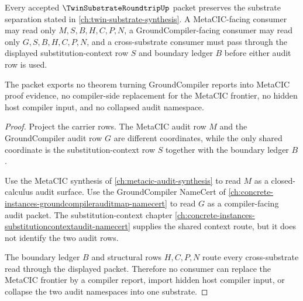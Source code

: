 \begin{theorem}
\label{thm:twinsubstrate-roundtrip-substrate-separation}
Every accepted $\TwinSubstrateRoundtripUp$ packet preserves the substrate separation stated in \autoref{ch:twin-substrate-synthesis}. A MetaCIC-facing consumer may read only $M,S,B,H,C,P,N$, a GroundCompiler-facing consumer may read only $G,S,B,H,C,P,N$, and a cross-substrate consumer must pass through the displayed substitution-context row $S$ and boundary ledger $B$ before either audit row is used.

The packet exports no theorem turning GroundCompiler reports into MetaCIC proof evidence, no compiler-side replacement for the MetaCIC frontier, no hidden host compiler input, and no collapsed audit namespace.
\end{theorem}
\begin{proof}
Project the carrier rows. The MetaCIC audit row $M$ and the GroundCompiler audit row $G$ are different coordinates, while the only shared coordinate is the substitution-context row $S$ together with the boundary ledger $B$.

Use the MetaCIC synthesis of \autoref{ch:metacic-audit-synthesis} to read $M$ as a closed-calculus audit surface. Use the GroundCompiler NameCert of \autoref{ch:concrete-instances-groundcompilerauditmap-namecert} to read $G$ as a compiler-facing audit packet. The substitution-context chapter \autoref{ch:concrete-instances-substitutioncontextaudit-namecert} supplies the shared context route, but it does not identify the two audit rows.

The boundary ledger $B$ and structural rows $H,C,P,N$ route every cross-substrate read through the displayed packet. Therefore no consumer can replace the MetaCIC frontier by a compiler report, import hidden host compiler input, or collapse the two audit namespaces into one substrate.
\end{proof}



